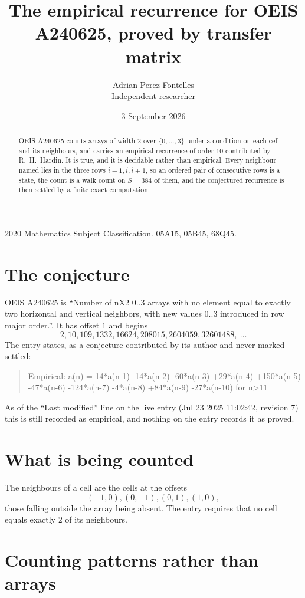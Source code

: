 \documentclass[11pt,a4paper]{article}
\title{The empirical recurrence for OEIS A240625, proved by transfer matrix}
\author{Adrian Perez Fontelles\\ \small Independent researcher}
\date{3 September 2026}
\theoremstyle{plain}
\theoremstyle{definition}
\begin{document}
\maketitle

\begin{abstract}
OEIS A240625 counts arrays of width $2$ over $\{0,\dots,3\}$ under a condition on each cell
and its neighbours, and carries an empirical recurrence of order $10$ contributed by
R.~H.~Hardin. It is true, and it is decidable rather than empirical. Every neighbour named lies
in the three rows $i-1,i,i+1$, so an ordered pair of consecutive rows is a state, the count is
a walk count on $S=384$ of them, and the conjectured recurrence is then settled by a finite
exact computation.
\end{abstract}

\noindent\small 2020 Mathematics Subject Classification. 05A15, 05B45, 68Q45.\normalsize

\section{The conjecture}

OEIS A240625 is ``Number of nX2 0..3 arrays with no element equal to exactly two horizontal and vertical neighbors, with new values 0..3 introduced in row major order.''. It has offset $1$ and begins
\[
2, 10, 109, 1332, 16624, 208015, 2604059, 32601488,\ \dots
\]
The entry states, as a conjecture contributed by its author and never marked settled:
\begin{quote}
Empirical: a(n) = 14*a(n-1) -14*a(n-2) -60*a(n-3) +29*a(n-4) +150*a(n-5) -47*a(n-6) -124*a(n-7) -4*a(n-8) +84*a(n-9) -27*a(n-10) for n>11
\end{quote}
As of the ``Last modified'' line on the live entry (Jul 23 2025 11:02:42, revision 7) this is still
recorded as empirical, and nothing on the entry records it as proved.

\section{What is being counted}

The neighbours of a cell are the cells at the offsets
\[
(-1,0), (0,-1), (0,1), (1,0),
\]
those falling outside the array being absent. The entry requires that no cell equals exactly $2$ of its neighbours.

\section{Counting patterns rather than arrays}
\end{document}

